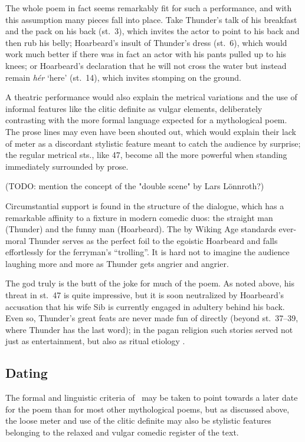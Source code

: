 The whole poem in fact seems remarkably fit for such a performance, and with this assumption many pieces fall into place.  Take Thunder’s talk of his breakfast and the pack on his back (st.~3), which invites the actor to point to his back and then rub his belly; Hoarbeard’s insult of Thunder’s dress (st.~6), which would work much better if there was in fact an actor with his pants pulled up to his knees; or Hoarbeard’s declaration that he will not cross the water but instead remain \emph{hér} ‘here’ (st.~14), which invites stomping on the ground.

A theatric performance would also explain the metrical variations and the use of informal features like the clitic definite as vulgar elements, deliberately contrasting with the more formal language expected for a mythological poem.
The prose lines may even have been shouted out, which would explain their lack of meter as a discordant stylistic feature meant to catch the audience by surprise; the regular metrical sts., like 47, become all the more powerful when standing immediately surrounded by prose.

(TODO: mention the concept of the "double scene" by Lars Lönnroth?)

Circumstantial support is found in the structure of the dialogue, which has a remarkable affinity to a fixture in modern comedic duos: the straight man (Thunder) and the funny man (Hoarbeard).  The by Wiking Age standards ever-moral Thunder serves as the perfect foil to the egoistic Hoarbeard and falls effortlessly for the ferryman’s “trolling”.  It is hard not to imagine the audience laughing more and more as Thunder gets angrier and angrier.

The god truly is the butt of the joke for much of the poem.  As noted above, his threat in st.~47 is quite impressive, but it is soon neutralized by Hoarbeard’s accusation that his wife Sib is currently engaged in adultery behind his back.  Even so, Thunder’s great feats are never made fun of directly (beyond st.~37--39, where Thunder has the last word); in the pagan religion such stories served not just as entertainment, but also as ritual etiology \parencite{Lindow1988}.

\subsection{Dating}

The formal and linguistic criteria of \Harbardsljod\ may be taken to point towards a later date for the poem than for most other mythological poems, but as discussed above, the loose meter and use of the clitic definite may also be stylistic features belonging to the relaxed and vulgar comedic register of the text.

